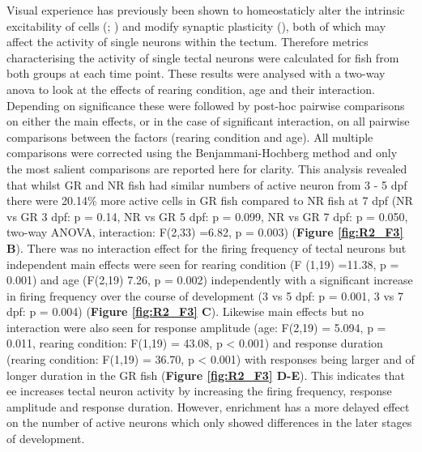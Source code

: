  Visual experience has previously been shown to homeostaticly alter the intrinsic excitability of cells (\cite{Aizenman2003VisuallyVivo}; \cite{Pratt2007HomeostaticCircuit}) and modify synaptic plasticity (\cite{Mu2006SpikeSystem}), both of which may affect the activity of single neurons within the tectum. Therefore metrics characterising the activity of single tectal neurons were calculated for fish from both groups at each time point. These results were analysed with a two-way \gls{anova} to look at the effects of rearing condition, age and their interaction. Depending on significance these were followed by post-hoc pairwise comparisons on either the main effects, or in the case of significant interaction, on all pairwise comparisons between the factors (rearing condition and age). All multiple comparisons were corrected using the Benjammani-Hochberg method and only the most salient comparisons are reported here for clarity. This analysis revealed that whilst GR and NR fish had similar numbers of active neuron from 3 - 5 \gls{dpf} there were 20.14\% more active cells in GR fish compared to NR fish at 7 \gls{dpf} (NR vs GR 3 \gls{dpf}: p = 0.14, NR vs GR 5 \gls{dpf}: p = 0.099, NR vs GR 7 \gls{dpf}: p = 0.050, two-way ANOVA, interaction:  F(2,33) =6.82, p = 0.003) (\textbf{Figure \ref{fig:R2_F3} B}).  There was no interaction effect for the firing frequency of tectal neurons but independent main effects were seen for rearing condition (F (1,19) =11.38, p = 0.001) and age (F(2,19) 7.26, p = 0.002) independently with a significant increase in firing frequency over the course of development (3 vs 5 \gls{dpf}: p = 0.001, 3 vs 7 \gls{dpf}: p = 0.004) (\textbf{Figure \ref{fig:R2_F3} C}). Likewise main effects but no interaction were also seen for response amplitude (age:  F(2,19) = 5.094, p = 0.011, rearing condition: F(1,19) = 43.08, p < 0.001) and response duration (rearing condition: F(1,19) = 36.70, p < 0.001) with responses being larger and of longer duration in the GR fish (\textbf{Figure \ref{fig:R2_F3} D-E}).  This indicates that \gls{ee} increases tectal neuron activity by increasing the firing frequency, response amplitude and response duration. However, enrichment has a more delayed effect on the number of active neurons which only showed differences in the later stages of development.

